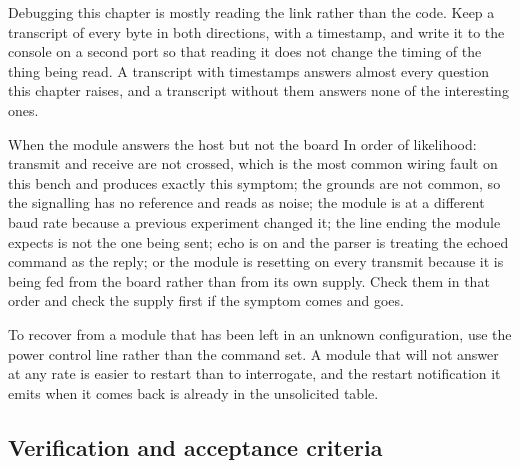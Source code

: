 Debugging this chapter is mostly reading the link rather than the code. Keep a
transcript of every byte in both directions, with a timestamp, and write it to
the console on a second port so that reading it does not change the timing of
the thing being read. A transcript with timestamps answers almost every question
this chapter raises, and a transcript without them answers none of the
interesting ones.

\begin{note}{When the module answers the host but not the board}
In order of likelihood: transmit and receive are not crossed, which is the most
common wiring fault on this bench and produces exactly this symptom; the grounds
are not common, so the signalling has no reference and reads as noise; the
module is at a different baud rate because a previous experiment changed it; the
line ending the module expects is not the one being sent; echo is on and the
parser is treating the echoed command as the reply; or the module is resetting
on every transmit because it is being fed from the board rather than from its
own supply. Check them in that order and check the supply first if the symptom
comes and goes.
\end{note}

To recover from a module that has been left in an unknown configuration, use the
power control line rather than the command set. A module that will not answer at
any rate is easier to restart than to interrogate, and the restart notification
it emits when it comes back is already in the unsolicited table.

\subsection*{Verification and acceptance criteria}

